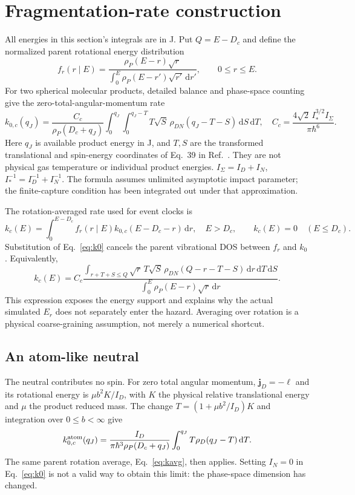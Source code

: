 \documentclass[10pt,a4paper]{article}
\newcommand{\dd}{\,\mathrm d}
\begin{document}
\section{Fragmentation-rate construction}\label{app:rates}
All energies in this section's integrals are in J. Put $Q=E-D_c$ and define
the normalized parent rotational energy distribution
\begin{equation}
 f_r(r\mid E)=\frac{\rho_P(E-r)\sqrt r}
 {\int_0^E\rho_P(E-r')\sqrt{r'}\dd r'},\qquad0\leq r\leq E.
 \label{eq:fr}
\end{equation}
For two spherical molecular products, detailed balance and phase-space
counting give the zero-total-angular-momentum rate~\cite{zapadinsky}
\begin{equation}
 k_{0,c}(q_J)=\frac{C_c}{\rho_P(D_c+q_J)}
 \int_0^{q_J}\!\int_0^{q_J-T}
 T\sqrt S\,\rho_{DN}(q_J-T-S)\dd S\dd T,
 \quad C_c=\frac{4\sqrt2\,I_*^{3/2}I_\Sigma}{\pi\hbar^6}.
 \label{eq:k0}
\end{equation}
Here $q_J$ is available product energy in J, and $T,S$ are the transformed
translational and spin-energy coordinates of Eq.~39 in Ref.~\cite{zapadinsky}.
They are not physical gas temperature or individual product energies.
$I_\Sigma=I_D+I_N$, $I_*^{-1}=I_D^{-1}+I_N^{-1}$.
The formula assumes unlimited asymptotic impact parameter; the finite-capture
condition has been integrated out under that approximation.

The rotation-averaged rate used for event clocks is
\begin{equation}
 k_c(E)=\int_0^{E-D_c} f_r(r\mid E)k_{0,c}(E-D_c-r)\dd r,
 \quad E>D_c,\qquad k_c(E)=0\quad(E\leq D_c).
 \label{eq:kavg}
\end{equation}
Substitution of Eq.~\eqref{eq:k0} cancels the parent vibrational DOS between
$f_r$ and $k_0$. Equivalently,
\[
 k_c(E)=C_c\frac{\displaystyle
 \int_{r+T+S\leq Q}\sqrt r\,T\sqrt S\,
 \rho_{DN}(Q-r-T-S)\dd r\dd T\dd S}
 {\displaystyle\int_0^E\rho_P(E-r)\sqrt r\dd r}.
\]
This expression exposes the energy support and explains why the actual
simulated $E_r$ does not separately enter the hazard. Averaging over rotation
is a physical coarse-graining assumption, not merely a numerical shortcut.

\subsection{An atom-like neutral}
The neutral contributes no spin. For zero total angular momentum,
$\mathbf j_D=-\boldsymbol\ell$ and its rotational energy is
$\mu b^2K/I_D$, with $K$ the physical relative translational energy and
$\mu$ the product reduced mass. The change
$T=(1+\mu b^2/I_D)K$ and integration over $0\leq b<\infty$ give~\cite{atom}
\begin{equation}
 k_{0,c}^{\rm atom}(q_J)=
 \frac{I_D}{\pi\hbar^3\rho_P(D_c+q_J)}
 \int_0^{q_J}T\rho_D(q_J-T)\dd T.
 \label{eq:atomrate}
\end{equation}
The same parent rotation average, Eq.~\eqref{eq:kavg}, then applies. Setting
$I_N=0$ in Eq.~\eqref{eq:k0} is not a valid way to obtain this limit: the
phase-space dimension has changed.
\end{document}
